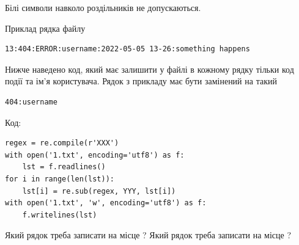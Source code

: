 \documentclass[12pt, ukrainian]{article}
\begin{document}
{Білі символи навколо роздільників не допускаються.

Приклад рядка файлу



\begin{verbatim}
13:404:ERROR:username:2022-05-05 13-26:something happens
\end{verbatim}


Нижче наведено код, який має залишити у файлі в кожному рядку тільки код події та ім'я користувача. Рядок з прикладу має бути замінений на такий



\begin{verbatim}
404:username
\end{verbatim}




Код:



\begin{verbatim}
regex = re.compile(r'XXX')
with open('1.txt', encoding='utf8') as f:
    lst = f.readlines()
for i in range(len(lst)):
    lst[i] = re.sub(regex, YYY, lst[i])
with open('1.txt', 'w', encoding='utf8') as f:
    f.writelines(lst)
\end{verbatim}





Який рядок треба записати на місце  ?
Який рядок треба записати на місце  ?\par

}
\end{document}
